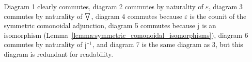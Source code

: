   Diagram 1 clearly commutes, diagram 2 commutes by naturality of
  $\varepsilon$, diagram 3 commutes by naturality of $\bigtriangledown_{}$,
  diagram 4 commutes because $\varepsilon$ is the counit of the
  symmetric comonoidal adjunction, diagram 5 commutes because $\mathsf{j}_{}$
  is an isomorphism
  (Lemma~\ref{lemma:symmetric_comonoidal_isomorphisms}), diagram 6
  commutes by naturality of $\mathsf{j}^{-1}_{}$, and diagram 7 is the same
  diagram as 3, but this diagram is redundant for readability.

